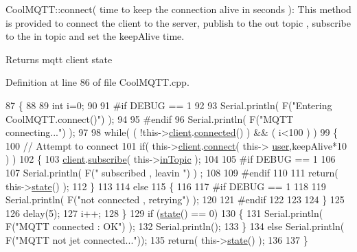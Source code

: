 Cool\+M\+Q\+T\+T\+::connect( time to keep the connection alive in seconds )\+: This method is provided to connect the client to the server, publish to the out topic , subscribe to the in topic and set the keep\+Alive time.

\begin{DoxyReturn}{Returns}
mqtt client state 
\end{DoxyReturn}


Definition at line 86 of file Cool\+M\+Q\+T\+T.\+cpp.


\begin{DoxyCode}
87 \{       
88 
89     \textcolor{keywordtype}{int} i=0;
90 
91 \textcolor{preprocessor}{#if DEBUG == 1 }
92 
93     Serial.println( F(\textcolor{stringliteral}{"Entering CoolMQTT.connect()"}) );
94 
95 \textcolor{preprocessor}{#endif}
96     Serial.println( F(\textcolor{stringliteral}{"MQTT connecting..."}) );
97     
98     \textcolor{keywordflow}{while}( ( !this->\hyperlink{class_cool_m_q_t_t_afed1372683c44893b4668d0f1771f514}{client}.\hyperlink{class_cool_pub_sub_client_a3d5a5da4ddb1e5c1bea64d80c665d148}{connected}() ) && ( i<100 ) ) 
99     \{
100         \textcolor{comment}{// Attempt to connect}
101         \textcolor{keywordflow}{if}( this->\hyperlink{class_cool_m_q_t_t_afed1372683c44893b4668d0f1771f514}{client}.\hyperlink{class_cool_pub_sub_client_a2664c2ebc302b2fa49f493a339ecc891}{connect}( this-> \hyperlink{class_cool_m_q_t_t_a8cd47e45d457f908d4b4390b35aaee83}{user},keepAlive*10  ) )
102         \{
103             \hyperlink{class_cool_m_q_t_t_afed1372683c44893b4668d0f1771f514}{client}.\hyperlink{class_cool_pub_sub_client_ac1ebc9ad874128aefa985d78496d2e8f}{subscribe}( this->\hyperlink{class_cool_m_q_t_t_a4492f52a441e83cc5151010317fdb52d}{inTopic} );
104 
105 \textcolor{preprocessor}{        #if DEBUG == 1 }
106 
107             Serial.println( F(\textcolor{stringliteral}{" subscribed , leavin "}) ) ;
108         
109 \textcolor{preprocessor}{        #endif}
110 
111             \textcolor{keywordflow}{return}( this->\hyperlink{class_cool_m_q_t_t_a5d003307eff78efbd585e42b43b72b6d}{state}() );
112         \}
113 
114         \textcolor{keywordflow}{else}
115         \{
116         
117 \textcolor{preprocessor}{        #if DEBUG == 1 }
118 
119             Serial.println( F(\textcolor{stringliteral}{"not connected , retrying"}) );
120         
121 \textcolor{preprocessor}{        #endif}
122 
123             
124         \}
125 
126     delay(5);
127     i++;
128     \}
129     \textcolor{keywordflow}{if} (\hyperlink{class_cool_m_q_t_t_a5d003307eff78efbd585e42b43b72b6d}{state}() == 0)
130     \{
131         Serial.println( F(\textcolor{stringliteral}{"MQTT connected : OK"}) );
132         Serial.println();
133     \}
134     \textcolor{keywordflow}{else} Serial.println( F(\textcolor{stringliteral}{"MQTT not jet connected..."}));
135     \textcolor{keywordflow}{return}( this->\hyperlink{class_cool_m_q_t_t_a5d003307eff78efbd585e42b43b72b6d}{state}() );
136 
137 \}
\end{DoxyCode}
